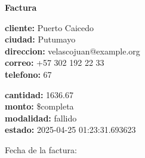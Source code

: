 \documentclass{article}
\begin{document}
\begin{center}
    {\LARGE \textbf{Factura}}\\[1cm]
\end{center}

\textbf{cliente:} Puerto Caicedo \\
\textbf{ciudad:} Putumayo \\
\textbf{direccion:} velascojuan@example.org \\
\textbf{correo:} +57 302 192 22 33 \\
\textbf{telefono:} 67 \\

\vspace{0.5cm}

\textbf{cantidad:} 1636.67 \\
\textbf{monto:} \$completa \\
\textbf{modalidad:} fallido \\
\textbf{estado:} 2025-04-25 01:23:31.693623 \\

\vspace{1cm}

Fecha de la factura: 
\end{document}
